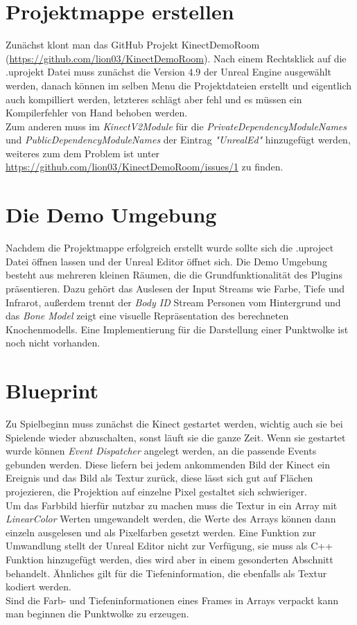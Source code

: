 \documentclass[a4paper]{IEEEtran}
\begin{document}
\section{Projektmappe erstellen}
	Zunächst klont man das GitHub Projekt KinectDemoRoom ({\url{https://github.com/lion03/KinectDemoRoom}}). 
	Nach einem Rechtsklick auf die .uprojekt Datei muss zunächst die Version 4.9 der Unreal Engine ausgewählt werden, danach können im selben Menu die Projektdateien erstellt und eigentlich auch kompilliert werden, letzteres schlägt aber fehl und es müssen ein Kompilerfehler von Hand behoben werden. \\
	Zum anderen muss im {\textit{KinectV2Module}} für die {\textit{PrivateDependencyModuleNames}} und {\textit{PublicDependencyModuleNames}} der Eintrag {\textit{"{}UnrealEd"{}}} hinzugefügt werden, weiteres zum dem Problem ist unter {\url{https://github.com/lion03/KinectDemoRoom/issues/1}} zu finden.\\

\section{Die Demo Umgebung}
	Nachdem die Projektmappe erfolgreich erstellt wurde sollte sich die .uproject Datei öffnen lassen und der Unreal Editor öffnet sich. 
	Die Demo Umgebung besteht aus mehreren kleinen Räumen, die die Grundfunktionalität des Plugins präsentieren. 
	Dazu gehört das Auslesen der Input Streams wie Farbe, Tiefe und Infrarot, außerdem trennt der {\textit{Body ID}} Stream Personen vom Hintergrund und das {\textit{Bone Model}} zeigt eine visuelle Repräsentation des berechneten Knochenmodells. 
	Eine Implementierung für die Darstellung einer Punktwolke ist noch nicht vorhanden. \\

\section{Blueprint}
	Zu Spielbeginn muss zunächst die Kinect gestartet werden, wichtig auch sie bei Spielende wieder abzuschalten, sonst läuft sie die ganze Zeit. 
	Wenn sie gestartet wurde können {\textit{Event Dispatcher}} angelegt werden, an die passende Events gebunden werden. 
	Diese liefern bei jedem ankommenden Bild der Kinect ein Ereignis und das Bild als Textur zurück, diese lässt sich gut auf Flächen projezieren, die Projektion auf einzelne Pixel gestaltet sich schwieriger. \\
	Um das Farbbild hierfür nutzbar zu machen muss die Textur in ein Array mit {\textit{LinearColor}} Werten umgewandelt werden, die Werte des Arrays können dann einzeln ausgelesen und als Pixelfarben gesetzt werden. 
	Eine Funktion zur Umwandlung stellt der Unreal Editor nicht zur Verfügung, sie muss als C++ Funktion hinzugefügt werden, dies wird aber in einem gesonderten Abschnitt behandelt. Ähnliches gilt für die Tiefeninformation, die ebenfalls als Textur kodiert werden. \\
	Sind die Farb- und Tiefeninformationen eines Frames in Arrays verpackt kann man beginnen die Punktwolke zu erzeugen.
\end{document}
